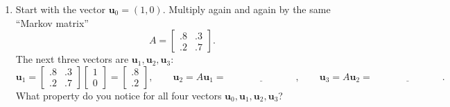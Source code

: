 \documentclass[14pt, a4paper]{article}
\begin{document}
\begin{enumerate}[resume]
    \item Start with the vector $\boldsymbol{u}_0 = (1, 0)$. Multiply again and again by the same ``Markov matrix''
          \[
              A = \begin{bmatrix} .8 & .3 \\ .2 & .7 \end{bmatrix}.
          \]
          The next three vectors are $\boldsymbol{u}_1, \boldsymbol{u}_2, \boldsymbol{u}_3$:
          \[
              \boldsymbol{u}_1 =
              \begin{bmatrix} .8 & .3 \\ .2 & .7 \end{bmatrix}
              \begin{bmatrix} 1 \\ 0 \end{bmatrix}
              = \begin{bmatrix} .8 \\ .2 \end{bmatrix},
              \qquad
              \boldsymbol{u}_2 = A\boldsymbol{u}_1 = \underline{\hspace{3cm}},
              \qquad
              \boldsymbol{u}_3 = A\boldsymbol{u}_2 = \underline{\hspace{3cm}}.
          \]
          What property do you notice for all four vectors $\boldsymbol{u}_0, \boldsymbol{u}_1, \boldsymbol{u}_2, \boldsymbol{u}_3$?
\end{enumerate}
\end{document}
